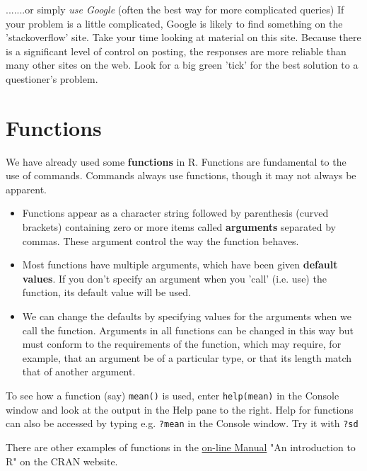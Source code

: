 \documentclass[titlepage]{book}
\begin{document}
.......or simply \emph{use Google} (often the best way for more complicated queries) If your problem is a little complicated, Google is likely to find something on the 'stackoverflow' site.  Take your time looking at material on this site.  Because there is a significant level of control on posting, the responses are more reliable than many other sites on the web. Look for a big green 'tick' for the best solution to a questioner's problem.

\section{Functions}
We have already used some \textbf{functions} in R.  Functions are fundamental to the use of commands. Commands always use functions, though it may not always be apparent.

\begin{itemize}
\item{Functions appear as a character string followed by parenthesis (curved brackets) containing zero or more items called \textbf{arguments} separated by commas. These argument control the way the function behaves.}

\item{Most functions have multiple  arguments, which have been given \textbf{default values}. If you don't specify an argument when you 'call' (i.e. use) the function, its default value will be used.}

\item{We can change the defaults by specifying values for the arguments when we call the function. Arguments in all functions can be changed in this way but must conform to the requirements of the function, which may require, for example, that an argument be of a particular type, or that its length match that of another argument.}

\end{itemize}

To see how a function (say) \texttt{mean()} is used, enter \texttt{help(mean)} in the Console window and look at the output in the Help pane to the right. Help for functions can also be accessed by typing e.g. \texttt{?mean} in the Console window. Try it with \texttt{?sd}

There are other examples of functions in the \href{https://cran.r-project.org/doc/manuals/r-release/R-intro.html#Simple-examples}{on-line Manual} "An introduction to R" on the CRAN website. 
\end{document}
